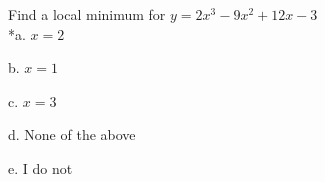 
Find a local minimum for \( y = 2x^{3} - 9x^{2} + 12x - 3 \)\\

*a. \( x = 2 \)

b. \( x = 1 \) 

c. \( x = 3 \)

d. None of the above

e. I do not \\
